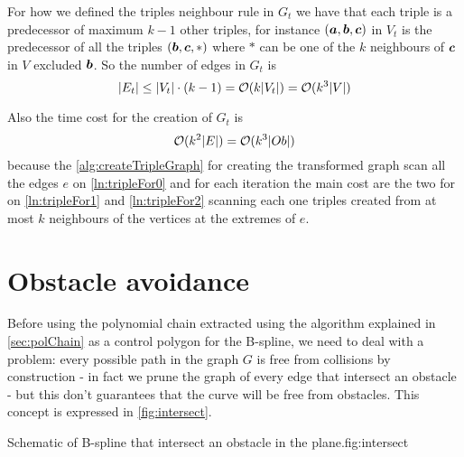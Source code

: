 \documentclass[dissertation.tex]{subfiles}
\begin{document}
For how we defined the triples neighbour rule in $G_t$ we have
that each triple is a predecessor of maximum $k-1$ other triples, for
instance $(\boldsymbol{a},\boldsymbol{b},\boldsymbol{c})$ in $V_t$ is the predecessor of all the triples
$(\boldsymbol{b},\boldsymbol{c},*)$ where $*$ can be one of the $k$ neighbours
of $\boldsymbol{c}$ in $V$ excluded $\boldsymbol{b}$. So the number of edges in $G_t$ is
\begin{equation}
  \label{eq:numEdgesTriples}
  |E_t|\leq |V_t|\cdot (k-1)=\mathcal{O}(k|V_t|)=\mathcal{O}(k^3|V|)
\end{equation}

Also the time cost for the creation of $G_t$ is
\newcommand{\eqCostVt}{\ensuremath{\bigO(k^3|Ob|)}}
\begin{equation}
  \label{eq:costVt}
  \bigO(k^2|E|)=\eqCostVt
\end{equation}
because the \cref{alg:createTripleGraph} for creating the transformed
graph scan all the edges $e$ on \cref{ln:tripleFor0} and for each
iteration
the main cost are the two for on \cref{ln:tripleFor1} and
\cref{ln:tripleFor2} scanning each one triples created from at most
$k$ neighbours
of the vertices at the extremes of $e$.

\section{Obstacle avoidance}\label{sec:obsAvoid}
Before using the polynomial chain extracted using the algorithm
explained in \cref{sec:polChain} as a control polygon for the
B-spline, we need to deal with a
problem: every possible path in the graph $G$ is
free from collisions by construction - in fact we prune the graph of
every edge that intersect an obstacle - but this don't guarantees that
the curve will be free from obstacles. This concept is expressed in \cref{fig:intersect}.
\begin{myfig}{Schematic of B-spline that intersect an obstacle in the plane.}{fig:intersect}
\end{myfig}
\end{document}
